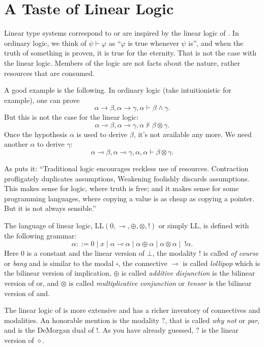 \section{A Taste of Linear Logic}

Linear type systems correspond to or are inspired by the linear logic of \cite{DBLP:journals/tcs/Girard87}. In ordinary logic, we think of $\psi \vdash \varphi$ as ``$\varphi$ is true whenever $\psi$ is'', and when the truth of something is proven, it is true for the eternity. That is not the case with the linear logic. Members of the logic are not facts about the nature, rather resources that are consumed.

A good example is the following. In ordinary logic (take intuitionistic for example), one can prove
\[
\alpha \rightarrow \beta, \alpha \rightarrow \gamma, \alpha \vdash \beta \wedge \gamma.
\]
But this is not the case for the linear logic:
\[
\alpha \multimap \beta, \alpha \multimap \gamma, \alpha \not\vdash \beta \otimes \gamma.
\]
Once the hypothesis $\alpha$ is used to derive $\beta$, it's not available any more. We need another $\alpha$ to derive $\gamma$:
\[
\alpha \multimap \beta, \alpha \multimap \gamma, \alpha, \alpha \vdash \beta \otimes \gamma.
\]

As \cite{DBLP:conf/mfcs/Wadler93} puts it: ``Traditional logic encourages reckless use of resources. Contraction profligately duplicates assumptions, Weakening foolishly discards assumptions. This makes sense for logic, where truth is free; and it makes sense for some programming languages, where copying a value is as cheap as copying a pointer. But it is not always sensible.''

The language of linear logic, LL$(0, \multimap, \oplus, \otimes, !)$ or simply LL, is defined with the following grammar:
\[
\alpha ::= 0 \mid x \mid \alpha \multimap \alpha \mid \alpha \oplus \alpha \mid \alpha \otimes \alpha \mid~ !\alpha.
\]
Here $0$ is a constant and the linear version of $\bot$, the modality $!$ is called \textit{of course} or \textit{bang} and is similar to the modal $\square$, the connective $\multimap$ is called \textit{lollipop} which is the bilinear version of implication, $\oplus$ is called \textit{additive disjunction} is the bilinear version of or, and $\otimes$ is called \textit{multiplicative conjunction} or \textit{tensor} is the bilinear version of and.

The linear logic of \cite{DBLP:journals/tcs/Girard87} is more extensive and has a richer inventory of connectives and modalities. An honorable mention is the modality $?$, that is called \textit{why not} or \textit{par}, and is the DeMorgan dual of $!$. As you have already guessed, $?$ is the linear version of $\diamond$.